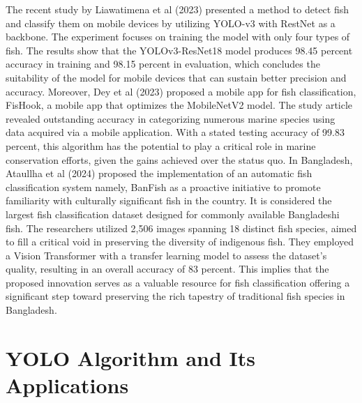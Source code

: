 The recent study by Liawatimena et al (2023) presented a method to detect fish and classify them on mobile devices by utilizing YOLO-v3 with RestNet as a backbone. The experiment focuses on training the model with only four types of fish. The results show that the YOLOv3-ResNet18 model produces 98.45 percent accuracy in training and 98.15 percent in evaluation, which concludes the suitability of the model for mobile devices that can sustain better precision and accuracy. Moreover, Dey et al (2023) proposed a mobile app for fish classification, FisHook, a mobile app that optimizes the MobileNetV2 model. The study article revealed outstanding accuracy in categorizing numerous marine species using data acquired via a mobile application. With a stated testing accuracy of 99.83 percent, this algorithm has the potential to play a critical role in marine conservation efforts, given the gains achieved over the status quo. In Bangladesh, Ataullha et al (2024) proposed the implementation of an automatic fish classification system namely, BanFish as a proactive initiative to promote familiarity with culturally significant fish in the country. It is considered the largest fish classification dataset designed for commonly available Bangladeshi fish. The researchers utilized 2,506 images spanning 18 distinct fish species, aimed to fill a critical void in preserving the diversity of indigenous fish. They employed a Vision Transformer with a transfer learning model to assess the dataset's quality, resulting in an overall accuracy of 83 percent. This implies that the proposed innovation serves as a valuable resource for fish classification offering a significant step toward preserving the rich tapestry of traditional fish species in Bangladesh. 

\section{YOLO Algorithm and Its Applications}


